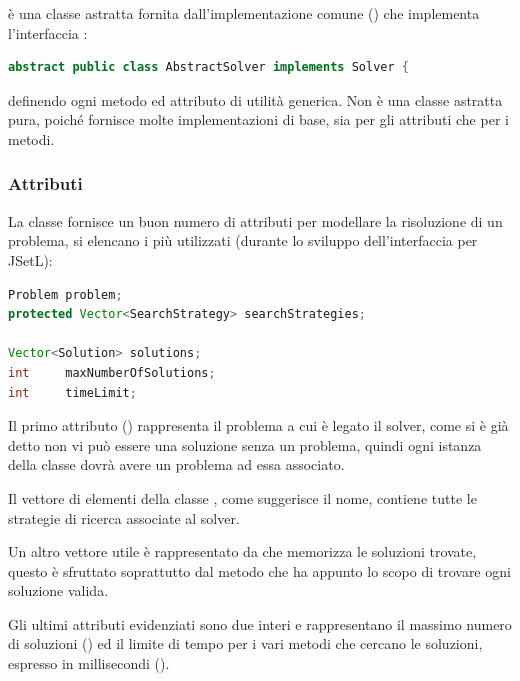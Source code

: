  è una classe astratta fornita dall'implementazione 
comune () che implementa l'interfaccia
:
\begin{lstlisting}[language = Java, frame = single]
abstract public class AbstractSolver implements Solver {
\end{lstlisting}
definendo ogni metodo ed attributo di utilità generica. Non è una classe
astratta pura, poiché fornisce molte implementazioni di base, sia per gli 
attributi che per i metodi.

\subsubsection{Attributi}
La classe fornisce un buon numero di attributi per modellare la risoluzione
di un problema, si elencano i più utilizzati (durante lo sviluppo 
dell'interfaccia per JSetL):
\begin{lstlisting}[language = Java,
                   frame = single]
Problem problem;
protected Vector<SearchStrategy> searchStrategies;

Vector<Solution> solutions;
int 	maxNumberOfSolutions;
int 	timeLimit;
\end{lstlisting}
Il primo attributo ()
rappresenta il problema a cui è legato il solver, come si è
già detto non vi può essere una soluzione senza un problema, quindi ogni istanza
della classe dovrà avere un problema ad essa associato.

Il vettore  di elementi della classe 
, come suggerisce
il nome, contiene tutte le strategie di ricerca associate al solver.

Un altro vettore utile è rappresentato da  che memorizza
le soluzioni trovate, questo è sfruttato soprattutto dal metodo
 che ha appunto lo scopo di trovare ogni soluzione 
valida.

Gli ultimi attributi evidenziati sono due interi e rappresentano il massimo 
numero di soluzioni () ed il limite di tempo
per i vari metodi che cercano le soluzioni, espresso in millisecondi 
().

